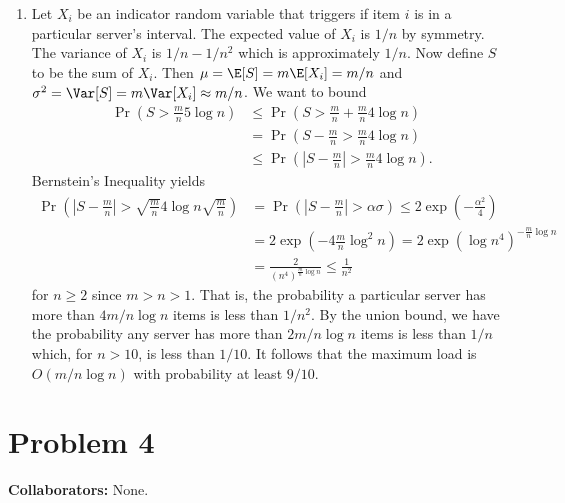 \begin{enumerate}
    \item
    Let $X_i$ be an indicator random variable
    that triggers if item $i$ is in a particular
    server's interval.
    The expected value of $X_i$ is $1/n$ by symmetry.
    The variance of $X_i$ is $1/n - 1/n^2$ which is
    approximately $1/n$.
    Now define $S$ to be the sum of $X_i$.
    Then $\mu = \E[S] = m \E[X_i] = m/n$
    and $\sigma^2 = \Var[S] = m \Var[X_i] \approx m/n$.
    We want to bound 
    \begin{align}
        \Pr(S > \frac{m}{n} 5 \log n)
        &\leq \Pr(S > \frac{m}{n} + \frac{m}{n} 4 \log n)
        \nonumber \\
        &= \Pr(S - \frac{m}{n} > \frac{m}{n} 4 \log n)
        \nonumber \\
        & \leq \Pr(|S - \frac{m}{n}| > \frac{m}{n} 4 \log n).
        \nonumber 
    \end{align}
    Bernstein's Inequality yields
    \begin{align}
        \Pr(|S - \frac{m}{n}| > \sqrt{\frac{m}{n}}
        4\log n \sqrt{\frac{m}{n}}) &= 
        \Pr(|S - \frac{m}{n}| > \alpha \sigma )
        \leq 2 \exp(-\frac{\alpha^2}{4})
        \nonumber \\
        &= 2\exp(-4\frac{m}{n} \log^2 n)
        = 2\exp(\log n^4)^{-\frac{m}{n}\log n}
        \nonumber \\
        &= \frac{2}{(n^4)^{\frac{m}{n}\log n}}
        \leq \frac{1}{n^2}
        \nonumber
    \end{align}
    for $n\geq 2$ since $m>n>1$.
    That is, the probability a particular
    server has more than $4 m/n \log n$ items
    is less than $1/n^2$.
    By the union bound, we have the probability
    any server has more than $2m/n \log n$ items
    is less than $1/n$ which, for $n>10$,
    is less than $1/10$.
    It follows that the maximum load
    is $O(m/n\log n)$ with probability at least $9/10$.

\end{enumerate}

\newpage
\section*{Problem 4}
\textbf{Collaborators:}  None.
\medskip

